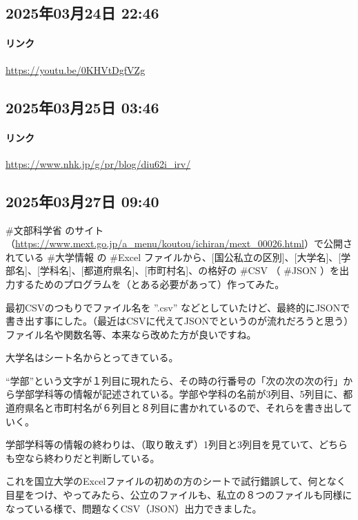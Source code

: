 \subsection*{2025年03月24日 22:46}

\paragraph{リンク}
\url{https://youtu.be/0KHVtDgfVZg}

\subsection*{2025年03月25日 03:46}

\paragraph{リンク}
\url{https://www.nhk.jp/g/pr/blog/diu62i_irv/}

\subsection*{2025年03月27日 09:40}

\#文部科学省 のサイト（\url{https://www.mext.go.jp/a_menu/koutou/ichiran/mext_00026.html}）で公開されている \#大学情報 の \#Excel ファイルから、[国公私立の区別]、[大学名]、[学部名]、[学科名]、[都道府県名]、[市町村名]、の格好の \#CSV （ \#JSON ）を出力するためのプログラムを（とある必要があって）作ってみた。

最初CSVのつもりでファイル名を ”.csv” などとしていたけど、最終的にJSONで書き出す事にした。（最近はCSVに代えてJSONでというのが流れだろうと思う）ファイル名や関数名等、本来なら改めた方が良いですね。

大学名はシート名からとってきている。

“学部”という文字が１列目に現れたら、その時の行番号の「次の次の次の行」から学部学科等の情報が記述されている。学部や学科の名前が3列目、5列目に、都道府県名と市町村名が６列目と８列目に書かれているので、それらを書き出していく。

学部学科等の情報の終わりは、（取り敢えず）1列目と3列目を見ていて、どちらも空なら終わりだと判断している。

これを国立大学のExcelファイルの初めの方のシートで試行錯誤して、何となく目星をつけ、やってみたら、公立のファイルも、私立の８つのファイルも同様になっている様で、問題なくCSV（JSON）出力できました。

